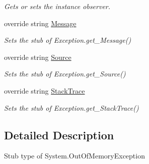 \begin{DoxyCompactItemize}
\begin{DoxyCompactList}\small\item\em Gets or sets the instance observer.\end{DoxyCompactList}\item 
override string \hyperlink{class_system_1_1_fakes_1_1_stub_out_of_memory_exception_a561901d3f33985b5c0bf4ce60b179b3d}{Message}
\begin{DoxyCompactList}\small\item\em Sets the stub of Exception.\-get\-\_\-\-Message()\end{DoxyCompactList}\item 
override string \hyperlink{class_system_1_1_fakes_1_1_stub_out_of_memory_exception_aabd5b9a856831adfda6f6e073ac7eff4}{Source}
\begin{DoxyCompactList}\small\item\em Sets the stub of Exception.\-get\-\_\-\-Source()\end{DoxyCompactList}\item 
override string \hyperlink{class_system_1_1_fakes_1_1_stub_out_of_memory_exception_abd7c1046e76503355d1c50a0ca6e10b0}{Stack\-Trace}
\begin{DoxyCompactList}\small\item\em Sets the stub of Exception.\-get\-\_\-\-Stack\-Trace()\end{DoxyCompactList}\end{DoxyCompactItemize}


\subsection{Detailed Description}
Stub type of System.\-Out\-Of\-Memory\-Exception



